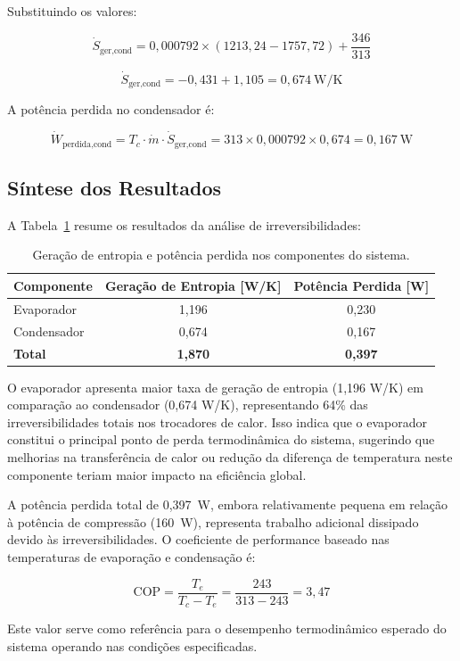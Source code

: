 Substituindo os valores:

\begin{equation}
    \dot{S}_{\text{ger,cond}} = 0{,}000792 \times (1213{,}24 - 1757{,}72) + \frac{346}{313}
\end{equation}

\begin{equation}
    \dot{S}_{\text{ger,cond}} = -0{,}431 + 1{,}105 = 0{,}674~\text{W/K}
\end{equation}

A potência perdida no condensador é:

\begin{equation}
    \dot{W}_{\text{perdida,cond}} = T_c \cdot \dot{m} \cdot \dot{S}_{\text{ger,cond}} = 313 \times 0{,}000792 \times 0{,}674 = 0{,}167~\text{W}
\end{equation}

\subsection{Síntese dos Resultados}

A Tabela~\ref{tab:geracao entropia} resume os resultados da análise de irreversibilidades:

\begin{table}[ht]
\centering
\begin{tabular}{|l|c|c|}
\hline
\textbf{Componente} & \textbf{Geração de Entropia [W/K]} & \textbf{Potência Perdida [W]} \\ \hline
Evaporador & 1,196 & 0,230 \\ \hline
Condensador & 0,674 & 0,167 \\ \hline
\textbf{Total} & \textbf{1,870} & \textbf{0,397} \\ \hline
\end{tabular}
\caption{Geração de entropia e potência perdida nos componentes do sistema.}
\label{tab:geracao entropia}
\end{table}

O evaporador apresenta maior taxa de geração de entropia (1,196 W/K) em comparação ao condensador (0,674 W/K), representando 64\% das irreversibilidades totais nos trocadores de calor. Isso indica que o evaporador constitui o principal ponto de perda termodinâmica do sistema, sugerindo que melhorias na transferência de calor ou redução da diferença de temperatura neste componente teriam maior impacto na eficiência global.

A potência perdida total de 0,397~W, embora relativamente pequena em relação à potência de compressão (160~W), representa trabalho adicional dissipado devido às irreversibilidades. O coeficiente de performance baseado nas temperaturas de evaporação e condensação é:

\begin{equation}
    \text{COP} = \frac{T_e}{T_c - T_e} = \frac{243}{313 - 243} = 3{,}47
\end{equation}

Este valor serve como referência para o desempenho termodinâmico esperado do sistema operando nas condições especificadas.